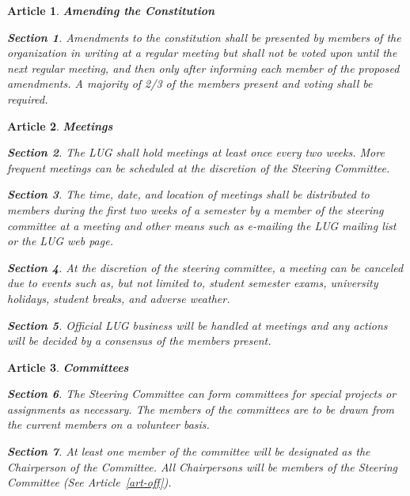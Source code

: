 \documentclass [letterpaper, 12pt]{article}
\newtheorem{art}{Article}
\newtheorem{sect}{Section}[art]
\begin{document}
\bigskip
\begin{art} {\bf Amending the Constitution}
\label{art-amemd}

\begin{sect}
Amendments to the constitution shall be presented by members of the
organization in writing at a regular meeting but shall not be voted
upon until the next regular meeting, and then only after informing
each member of the proposed amendments.  A majority of 2/3 of the
members present and voting shall be required.
\end{sect}

\end{art}

\bigskip
\bigskip
\begin{art} {\bf Meetings}
\label{art-meet}

\begin{sect}
The LUG shall hold meetings at least once every two weeks.
More frequent meetings can be scheduled at the discretion of the 
Steering Committee.
\end{sect}
\begin{sect}
The time, date, and location of meetings shall be distributed to
members during the first two weeks of a semester by a member of the
steering committee at a meeting and other means such as e-mailing the LUG
mailing list or the LUG web page.
\end{sect}
\begin{sect}
At the discretion of the steering committee, a meeting can be canceled
due to events such as, but not limited to, student semester exams, university
holidays, student breaks, and adverse weather.
\end{sect}
\begin{sect}
Official LUG business will be handled at meetings and any actions will be
decided by a consensus of the members present.
\end{sect}

\end{art}

\bigskip
\begin{art} {\bf Committees}
\label{art-coms}

\begin{sect}
The Steering Committee can form committees for special projects or
assignments as necessary. The members of the committees are to be drawn
from the current members on a volunteer basis.
\end{sect}

\begin{sect}
At least one member of the committee will be designated as the Chairperson of
the Committee.  All Chairpersons will be members of the Steering Committee
(See Article~\ref{art-off}).
\end{sect}

\end{art}

\vfil
\end{document}
